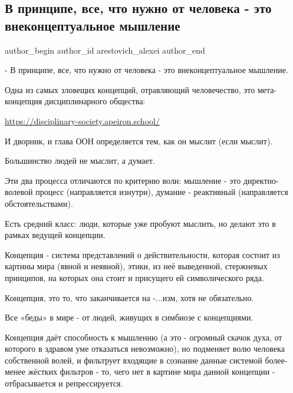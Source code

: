  
 
 
 
 
 
\subsection{В принципе, все, что нужно от человека - это внеконцептуальное мышление}
\label{sec:09_08_2021.fb.arestovich_alexei.1.myshlenie_chelovek}
 
\ifcmt
 author_begin
   author_id arestovich_alexei
 author_end
\fi

- В принципе, все, что нужно от человека - это внеконцептуальное мышление.

Одна из самых зловещих концепций, отравляющий человечество, это мета-концепция
дисциплинарного общества:

\url{https://disciplinary-society.apeiron.school/}

И дворник, и глава ООН определяется тем, как он мыслит (если мыслит).

Большинство людей не мыслит, а думает.

Эти два процесса отличаются по критерию воли: мышление - это директно-волевой
процесс (направляется изнутри), думание - реактивный (направляется
обстоятельствами). 

Есть средний класс: люди, которые уже пробуют мыслить, но делают это в рамках ведущей  концепции.

Концепция - система представлений о действительности, которая состоит из
картины мира (явной и неявной), этики, из неё выведенной, стержневых принципов,
на которых она стоит и присущего ей символического ряда. 

Концепция, это то, что заканчивается на -...изм, хотя не обязательно. 

Все «беды» в мире - от людей, живущих в симбиозе с концепциями. 

Концепция даёт способность к мышлению (а это - огромный скачок духа, от
которого в здравом уме отказаться невозможно), но подменяет волю человека
собственной волей, и фильтрует входящие в сознание данные системой более-менее
жёстких фильтров - то, чего нет в картине мира данной концепции - отбрасывается
и репрессируется.

